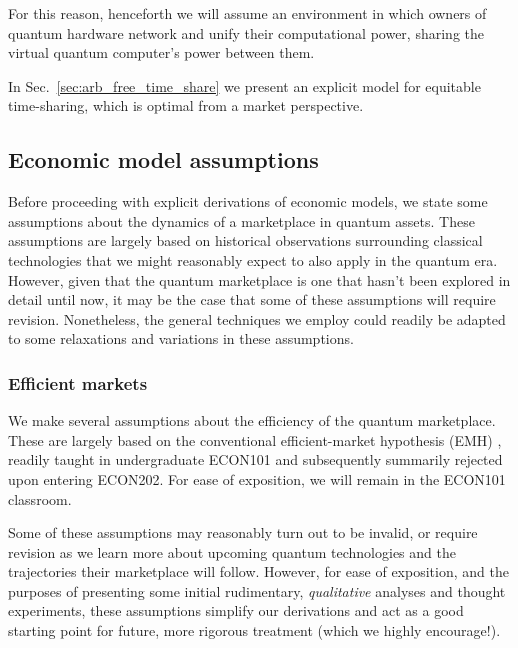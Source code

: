 For this reason, henceforth we will assume an environment in which owners of quantum hardware network and unify their computational power, sharing the virtual quantum computer's power between them.

In Sec.~\ref{sec:arb_free_time_share} we present an explicit model for equitable time-sharing, which is optimal from a market perspective.

%
%

\subsection{Economic model assumptions}

Before proceeding with explicit derivations of economic models, we state some assumptions about the dynamics of a marketplace in quantum assets. These assumptions are largely based on historical observations surrounding classical technologies that we might reasonably expect to also apply in the quantum era. However, given that the quantum marketplace is one that hasn't been explored in detail until now, it may be the case that some of these assumptions will require revision. Nonetheless, the general techniques we employ could readily be adapted to some relaxations and variations in these assumptions.

%
%

\subsubsection{Efficient markets}\label{sec:eff_markets} 

We make several assumptions about the efficiency of the quantum marketplace. These are largely based on the conventional efficient-market hypothesis (EMH) \cite{???}, readily taught in undergraduate ECON101 and subsequently summarily rejected upon entering ECON202. For ease of exposition, we will remain in the ECON101 classroom.

Some of these assumptions may reasonably turn out to be invalid, or require revision as we learn more about upcoming quantum technologies and the trajectories their marketplace will follow. However, for ease of exposition, and the purposes of presenting some initial rudimentary, \textit{qualitative} analyses and thought experiments, these assumptions simplify our derivations and act as a good starting point for future, more rigorous treatment (which we highly encourage!).

